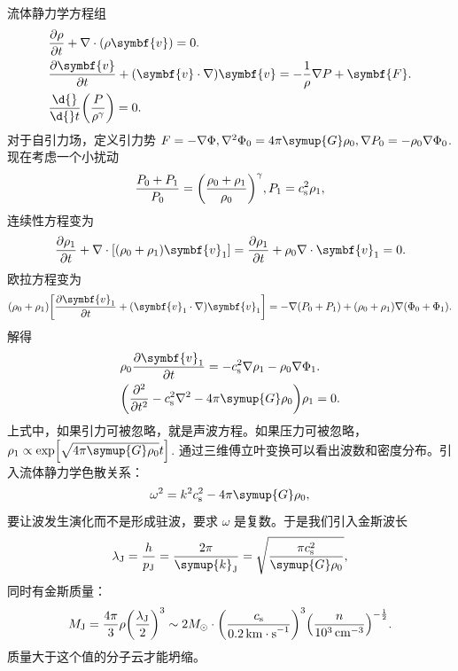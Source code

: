 \documentclass[../天体物理基础.tex]{subfiles}
\begin{document}
流体静力学方程组
\begin{align}
&\frac{\partial\rho}{\partial{}t}+\nabla\cdot\mleft(\rho\symbf{v}\mright)=0.\\
&\frac{\partial\symbf{v}}{\partial{}t}+\mleft(\symbf{v}\cdot\nabla\mright)\symbf{v}=-\frac{1}{\rho}\nabla P+\symbf{F}.\\
&\frac{\d{}}{\d{}t}\mleft(\frac{P}{\rho^{\gamma}}\mright)=0.
\end{align}
对于自引力场，定义引力势 $F=-\nabla\Phi,\nabla^{2}\Phi_{0}=4\pi\symup{G}\rho_{0},\nabla P_{0}=-\rho_{0}\nabla\Phi_{0}$.
现在考虑一个小扰动
\begin{equation}
\frac{P_{0}+P_{1}}{P_{0}}=\mleft(\frac{\rho_{0}+\rho_{1}}{\rho_{0}}\mright)^{\gamma}, P_{1}=c_{\mathrm{s}}^{2}\rho_{1},
\end{equation}
连续性方程变为
\begin{equation}
\frac{\partial\rho_{1}}{\partial{}t}+\nabla\cdot\mleft[\mleft(\rho_{0}+\rho_{1}\mright)\symbf{v}_{1}\mright]=\frac{\partial\rho_{1}}{\partial{}t}+\rho_{0}\nabla\cdot\symbf{v}_{1}=0.
\end{equation}
欧拉方程变为
\begin{equation}
\mleft(\rho_{0}+\rho_{1}\mright)\mleft[\frac{\partial\symbf{v}_{1}}{\partial t}+\mleft(\symbf{v}_{1}\cdot\nabla\mright)\symbf{v}_{1}\mright]=-\nabla\mleft(P_{0}+P_{1}\mright)+\mleft(\rho_{0}+\rho_{1}\mright)\nabla\mleft(\Phi_{0}+\Phi_{1}\mright).
\end{equation}
解得
\begin{align}
&\rho_{0}\frac{\partial\symbf{v}_{1}}{\partial t}=-c_{\mathrm{s}}^{2}\nabla\rho_{1}-\rho_{0}\nabla\Phi_{1}.\\
&\mleft(\frac{\partial{}^{2}}{\partial{}t^{2}}-c_{\mathrm{s}}^{2}\nabla^{2}-4\pi\symup{G}\rho_{0}\mright)\rho_{1}=0.
\end{align}
上式中，如果引力可被忽略，就是声波方程。如果压力可被忽略，$\rho_{1}\propto\exp\mleft[\sqrt{4\pi\symup{G}\rho_{0}}t\mright]$. 通过三维傅立叶变换可以看出波数和密度分布。引入流体静力学色散关系：
\begin{equation}
\omega^{2}=k^{2}c_{\mathrm{s}}^{2}-4\pi\symup{G}\rho_{0},
\end{equation}
要让波发生演化而不是形成驻波，要求 $\omega$ 是复数。于是我们引入金斯波长
\begin{equation}
\lambda_{\mathrm{J}}=\frac{h}{p_{\mathrm{J}}}=\frac{2\pi}{\symup{k}_{\mathrm{J}}}=\sqrt{\frac{\pi{}c_{\mathrm{s}}^{2}}{\symup{G}\rho_{0}}},
\end{equation}
同时有金斯质量：
\begin{equation}
M_{\mathrm{J}}=\frac{4\pi}{3}\rho\mleft(\frac{\lambda_{\mathrm{J}}}{2}\mright)^{3}\sim 2M_{\odot}\cdot\mleft(\frac{c_{\mathrm{s}}}{\qty{0.2}{km\cdot{}s^{-1}}}\mright)^{3}\mleft(\frac{n}{\qty{e3}{cm^{-3}}}\mright)^{-\frac{1}{2}}.
\end{equation}
质量大于这个值的分子云才能坍缩。
\end{document}
